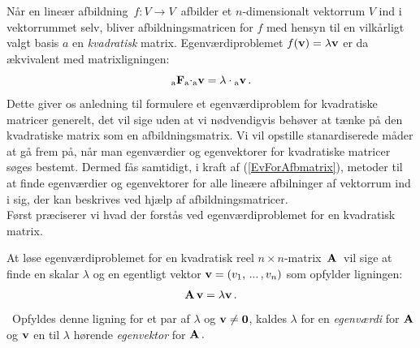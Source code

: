 Når en lineær afbildning $\,f:V\rightarrow V\,$ afbilder et $n$-dimensionalt vektorrum $V$ ind i vektorrummet selv, bliver afbildningsmatricen for $f$ med hensyn til en vilkårligt valgt  basis $a$ en \textit{kvadratisk} matrix. Egenværdiproblemet $f(\mathbf{v})=\lambda \mathbf{v}$ er da ækvivalent med matrixligningen:
\begin{equation}\label{EvForAfbmatrix}
{_\mathrm{a}\mathbf{F}_\mathrm{a}} \mathbf{\cdot} {_\mathrm{a}\mathbf{v}}=\lambda \cdot {_\mathrm{a}\mathbf{v}}\,.\end{equation}
Dette giver os anledning til formulere et egenværdiproblem for kvadratiske matricer generelt, det vil sige uden at vi nødvendigvis behøver at tænke på den kvadratiske matrix som en afbildningsmatrix. Vi vil opstille  stanar\-diserede måder at gå frem på, når man egenværdier og egenvektorer for kvadratiske matricer søges bestemt. Dermed fås samtidigt, i kraft af (\ref{EvForAfbmatrix}), metoder til at finde egenværdier og egenvektorer for alle lineære afbilninger af vektorrum ind i sig, der kan beskrives ved hjælp af afbildningsmatricer.\\
 
Først præciserer vi hvad der forstås ved egenværdiproblemet for en kvadratisk matrix.

\begin{definition} \label{def.eig}
At løse egenværdiproblemet for en kvadratisk reel $n \times n$-matrix $\,\mathbf{A}\,$ vil sige at finde en skalar $ \lambda $ og en egentligt vektor $\mathbf{v}=(v_1,\,...\,,v_n)$ som opfylder ligningen:
\begin{equation}\label{def.eig.formel1}
\mathbf{A} \,\mathbf{v} = \lambda \mathbf{v} \,.
\end{equation}\
Opfyldes denne ligning for et par af $ \lambda $ og $ \mathbf{v} \neq \mathbf 0 $, kaldes $ \lambda $ for en \textit{egenværdi} for $\mathbf{A}$ og $\mathbf{v} $ en til $\lambda$ hørende \textit{egenvektor} for $\mathbf{A}\,.$ 
\end{definition}

